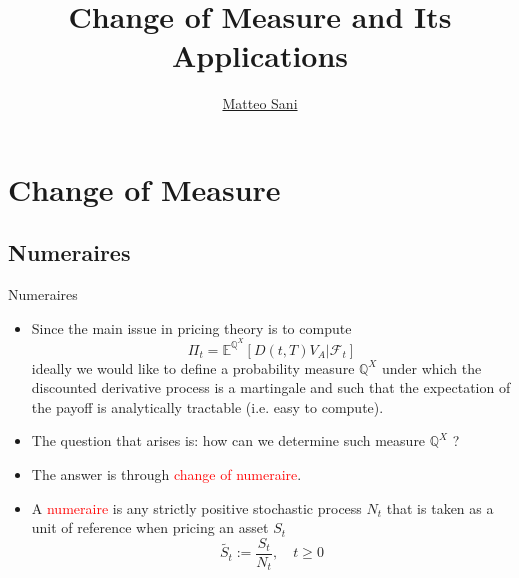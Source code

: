 \documentclass{beamer}
\title{Change of Measure and Its Applications}
\author{\href{mailto:matteo.sani@unisi.it}{Matteo Sani}}
\begin{document}
\begin{frame}[plain]
  \maketitle
\end{frame}

\section{Change of Measure}

\subsection{Numeraires}
\begin{frame}{Numeraires}
  \begin{itemize}
  \item<1-> Since the main issue in pricing theory is to compute
		\begin{equation}
			\Pi_t = \mathbb{E}^{\mathbb{Q}^X}[D(t,T)V_A|\mathcal{F}_t]
			\label{eq:risk_neutral_pricing}
		\end{equation}
  ideally we would like to define a probability measure $\mathbb{Q}^X$ under which the discounted derivative process is a martingale and such that the expectation of the payoff is analytically tractable (i.e. easy to compute).
  \item<1-> The question that arises is: how can we determine such measure $\mathbb{Q}^X$ ?
  \item<2-> The answer is through \textcolor{red}{change of numeraire}.
  \item<3-> A \textcolor{red}{numeraire} is any strictly positive stochastic process $N_t$ that is taken as a unit of reference when pricing an asset $S_t$
    \begin{equation*}
      \tilde{S_t}:=\frac{S_t}{N_t}, \quad t \ge 0
    \end{equation*}
  \end{itemize}
\end{frame}
\end{document}
